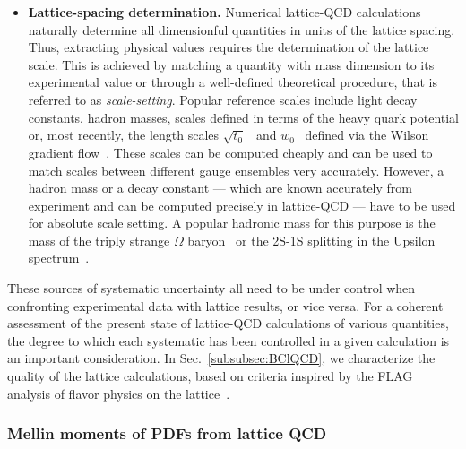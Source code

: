 \begin{itemize}
\item {\bfseries Lattice-spacing determination.} 
Numerical lattice-QCD calculations naturally determine all dimensionful 
quantities in units of the lattice spacing. 
%
Thus, extracting physical values requires the determination of the lattice 
scale. 
%
This is achieved by matching a quantity with mass dimension to its experimental 
value or through a well-defined theoretical procedure, that is referred to as
{\it scale-setting}. 
%
Popular reference scales include light decay constants, hadron masses, 
scales defined in terms of the heavy quark potential or, most recently, 
the length scales $\sqrt{t_0}$~\cite{Luscher:2010iy} and 
$w_0$~\cite{Borsanyi:2012zs} defined via the Wilson  gradient 
flow~\cite{Luscher:2010iy}. 
%
These scales can be computed cheaply and can be used to 
match scales between different gauge ensembles very accurately.  
%
However, a hadron mass or a decay constant --- which are known accurately 
from experiment and can be computed precisely in lattice-QCD --- 
have to be used for absolute scale setting. 
%
A popular hadronic mass for this purpose is the mass of the triply strange 
$\Omega$ baryon~\cite{Durr:2008zz} or the 2S-1S splitting in the Upsilon 
spectrum~\cite{Kendall:2008zz}.

\end{itemize}

These sources of systematic uncertainty all need to be under control
when confronting experimental data with lattice results, or vice
versa.
%
For a coherent assessment of the present state of lattice-QCD
calculations of various quantities, the degree to which each
systematic has been controlled in a given calculation is an important
consideration.
%
In Sec.~\ref{subsubsec:BClQCD}, we characterize the
quality of the lattice calculations, based on criteria inspired by the
FLAG analysis of flavor physics on the lattice~\cite{Aoki:2016frl}.

\subsubsection{Mellin moments of PDFs from lattice QCD}
\label{Sec:MomentsLQCD}

